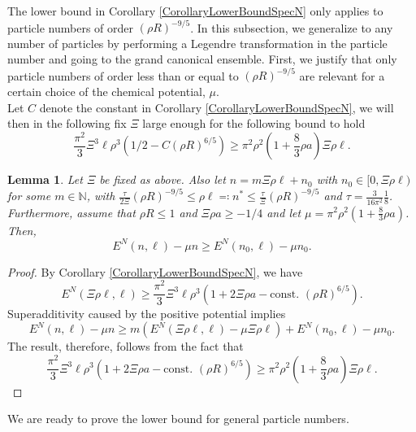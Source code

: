 \documentclass[a4paper,11pt]{article}
\newtheorem{lemma}[theorem]{Lemma}
\numberwithin{equation}{section}
\begin{document}
	The lower bound in Corollary \ref{CorollaryLowerBoundSpecN} only applies to particle numbers of order $ (\rho R)^{-9/5} $. In this subsection, we generalize to any number of particles by performing a Legendre transformation in the particle number and going to the grand canonical ensemble. First, we justify that only particle numbers of order less than or equal to $ (\rho R)^{-9/5} $ are relevant for a certain choice of the chemical potential, $ \mu $.\\
	Let $C$ denote the constant in Corollary \ref{CorollaryLowerBoundSpecN}, we will then in the following fix $\Xi$ large enough for the following bound to hold $$
	\frac{\pi^2}{3}\Xi^3\ell\rho^3\left(1/2-C(\rho R)^{6/5}\right)\geq \pi^2\rho^2\left(1+\frac{8}{3}\rho a\right) \Xi\rho\ell.
	$$
	\begin{lemma}\label{LemmaLocalizationFbound}
		Let $ \Xi$ be fixed as above. Also let $ n=m\Xi \rho \ell+n_0 $ with $ n_0\in[0,\Xi\rho \ell) $ for some $ m\in\mathbb{N} $, with $\frac{\tau}{2\Xi} (\rho R)^{-9/5} \leq \rho\ell\eqqcolon n^{\ast}\leq \frac{\tau}{\Xi} (\rho R)^{-9/5} $ and $ \tau=\frac{3}{16\pi^2}\frac{1}{8} $. Furthermore, assume that $ \rho R\leq  1 $ and $\Xi \rho a \geq-1/4$ and let $ \mu=\pi^2\rho^2\left(1+\frac{8}{3}\rho a\right) $. Then,  \begin{equation}
			E^{N}(n,\ell)-\mu n \geq E^{N}(n_0,\ell)-\mu n_0.
		\end{equation}
	\end{lemma}
	\begin{proof}
		By Corollary \ref{CorollaryLowerBoundSpecN}, we have \begin{equation}
			E^{N}(\Xi\rho\ell,\ell)\geq\frac{\pi^2}{3}\Xi^3\ell\rho^3\left(1+2\Xi\rho a-\text{const. }(\rho R)^{6/5}\right).
		\end{equation}
		Superadditivity caused by the positive potential implies \begin{equation}
			E^N(n,\ell)-\mu n\geq m\left(E^N(\Xi\rho\ell,\ell)-\mu\Xi\rho\ell \right)+E^N(n_0,\ell)-\mu n_0.
		\end{equation}
		The result, therefore, follows from the fact that \begin{equation}
			\frac{\pi^2}{3}\Xi^3\ell\rho^3\left(1+2\Xi\rho a-\text{const. }(\rho R)^{6/5}\right)\geq \pi^2\rho^2\left(1+\frac{8}{3}\rho a\right) \Xi\rho\ell.
		\end{equation}
	\end{proof}
	We are ready to prove the lower bound for general particle numbers.
\end{document}
